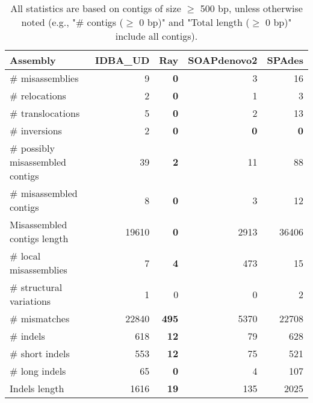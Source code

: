 \documentclass[12pt,a4paper]{article}
\begin{document}
\begin{table}[ht]
\begin{center}
\caption{All statistics are based on contigs of size $\geq$ 500 bp, unless otherwise noted (e.g., "\# contigs ($\geq$ 0 bp)" and "Total length ($\geq$ 0 bp)" include all contigs).}
\begin{tabular}{|l*{4}{|r}|}
\hline
Assembly & IDBA\_UD & Ray & SOAPdenovo2 & SPAdes \\ \hline
\# misassemblies & 9 & {\bf 0} & 3 & 16 \\ \hline
\hspace{5mm}\# relocations & 2 & {\bf 0} & 1 & 3 \\ \hline
\hspace{5mm}\# translocations & 5 & {\bf 0} & 2 & 13 \\ \hline
\hspace{5mm}\# inversions & 2 & {\bf 0} & {\bf 0} & {\bf 0} \\ \hline
\# possibly misassembled contigs & 39 & {\bf 2} & 11 & 88 \\ \hline
\# misassembled contigs & 8 & {\bf 0} & 3 & 12 \\ \hline
Misassembled contigs length & 19610 & {\bf 0} & 2913 & 36406 \\ \hline
\# local misassemblies & 7 & {\bf 4} & 473 & 15 \\ \hline
\# structural variations & 1 & 0 & 0 & 2 \\ \hline
\# mismatches & 22840 & {\bf 495} & 5370 & 22708 \\ \hline
\# indels & 618 & {\bf 12} & 79 & 628 \\ \hline
\hspace{5mm}\# short indels & 553 & {\bf 12} & 75 & 521 \\ \hline
\hspace{5mm}\# long indels & 65 & {\bf 0} & 4 & 107 \\ \hline
Indels length & 1616 & {\bf 19} & 135 & 2025 \\ \hline
\end{tabular}
\end{center}
\end{table}
\end{document}
